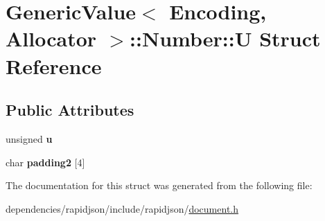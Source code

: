 \hypertarget{struct_generic_value_1_1_number_1_1_u}{}\section{Generic\+Value$<$ Encoding, Allocator $>$\+:\+:Number\+:\+:U Struct Reference}
\label{struct_generic_value_1_1_number_1_1_u}
\subsection*{Public Attributes}
\begin{DoxyCompactItemize}
\item 
\mbox{\label{struct_generic_value_1_1_number_1_1_u_a175e3a2bd43e6880791eb7c950d2f147}} 
unsigned {\bfseries u}
\item 
\mbox{\label{struct_generic_value_1_1_number_1_1_u_a9341f65c1645f24fd001a1ebf58d3c5b}} 
char {\bfseries padding2} \mbox{[}4\mbox{]}
\end{DoxyCompactItemize}


The documentation for this struct was generated from the following file\+:\begin{DoxyCompactItemize}
\item 
dependencies/rapidjson/include/rapidjson/\hyperlink{document_8h}{document.\+h}\end{DoxyCompactItemize}
